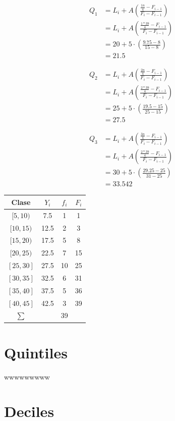 \documentclass[10pt,]{krantz}
\theoremstyle{definition}
\theoremstyle{definition}
\theoremstyle{definition}
\theoremstyle{definition}
\theoremstyle{remark}
\begin{document}
\[
\begin{aligned}
Q_1&=L_i+ A\left(\frac{\frac{1n}{4}-F_{i-1}}{F_i-F_{i-1}}\right)\\
&=L_i+ A\left(\frac{\frac{1*39}{4}-F_{i-1}}{F_i-F_{i-1}}\right)\\
&=20+ 5\cdot\left(\frac{9.75 -8}{15-8}\right)\\
&=21.5
\end{aligned}
\]

\[
\begin{aligned}
Q_2&=L_i+ A\left(\frac{\frac{2n}{4}-F_{i-1}}{F_i-F_{i-1}}\right)\\
&=L_i+ A\left(\frac{\frac{2*39}{4}-F_{i-1}}{F_i-F_{i-1}}\right)\\
&=25+ 5\cdot\left(\frac{19.5 -15}{25-15}\right)\\
&= 27.5
\end{aligned}
\]

\[
\begin{aligned}
Q_3&=L_i+ A\left(\frac{\frac{3n}{4}-F_{i-1}}{F_i-F_{i-1}}\right)\\
&=L_i+ A\left(\frac{\frac{2*39}{4}-F_{i-1}}{F_i-F_{i-1}}\right)\\
&=30+ 5\cdot\left(\frac{29.25 -25}{31-25}\right)\\
&= 33.542
\end{aligned}
\]

\begin{longtable}[]{@{}cccc@{}}
\toprule
Clase & \(Y_i\) & \(f_i\) & \(F_i\)\tabularnewline
\midrule
\endhead
\([5,10)\) & 7.5 & 1 & 1\tabularnewline
\([10,15)\) & 12.5 & 2 & 3\tabularnewline
\([15,20)\) & 17.5 & 5 & 8\tabularnewline
\([20,25)\) & 22.5 & 7 & 15\tabularnewline
\([25,30]\) & 27.5 & 10 & 25\tabularnewline
\([30,35]\) & 32.5 & 6 & 31\tabularnewline
\([35,40]\) & 37.5 & 5 & 36\tabularnewline
\([40,45]\) & 42.5 & 3 & 39\tabularnewline
\(\sum\) & & 39 &\tabularnewline
\bottomrule
\end{longtable}

\hypertarget{quintiles}{%
\section{Quintiles}\label{quintiles}}

wwwwwwwww

\hypertarget{deciles}{%
\section{Deciles}\label{deciles}}
\end{document}
